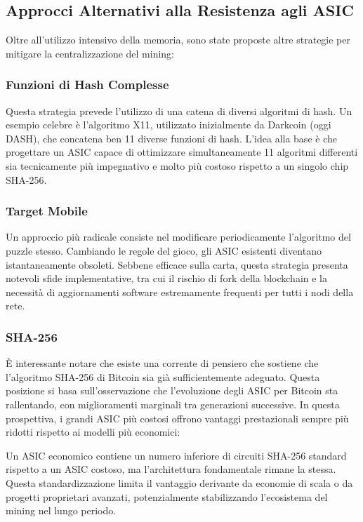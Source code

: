 \subsection{Approcci Alternativi alla Resistenza agli ASIC}
Oltre all'utilizzo intensivo della memoria, sono state proposte altre strategie per mitigare la centralizzazione del mining:

\subsubsection*{Funzioni di Hash Complesse}
Questa strategia prevede l'utilizzo di una catena di diversi algoritmi di hash. Un esempio celebre è l'algoritmo X11, utilizzato inizialmente da Darkcoin (oggi DASH), che concatena ben 11 diverse funzioni di hash. L'idea alla base è che progettare un ASIC capace di ottimizzare simultaneamente 11 algoritmi differenti sia tecnicamente più impegnativo e molto più costoso rispetto a un singolo chip SHA-256.

\subsubsection*{Target Mobile}
Un approccio più radicale consiste nel modificare periodicamente l'algoritmo del puzzle stesso. Cambiando le regole del gioco, gli ASIC esistenti diventano istantaneamente obsoleti. Sebbene efficace sulla carta, questa strategia presenta notevoli sfide implementative, tra cui il rischio di fork della blockchain e la necessità di aggiornamenti software estremamente frequenti per tutti i nodi della rete.

\subsubsection*{SHA-256}
È interessante notare che esiste una corrente di pensiero che sostiene che l'algoritmo SHA-256 di Bitcoin sia già sufficientemente adeguato. Questa posizione si basa sull'osservazione che l'evoluzione degli ASIC per Bitcoin sta rallentando, con miglioramenti marginali tra generazioni successive. In questa prospettiva, i grandi ASIC più costosi offrono vantaggi prestazionali sempre più ridotti rispetto ai modelli più economici:

Un ASIC economico contiene un numero inferiore di circuiti SHA-256 standard rispetto a un ASIC costoso, ma l'architettura fondamentale rimane la stessa. Questa standardizzazione limita il vantaggio derivante da economie di scala o da progetti proprietari avanzati, potenzialmente stabilizzando l'ecosistema del mining nel lungo periodo.

